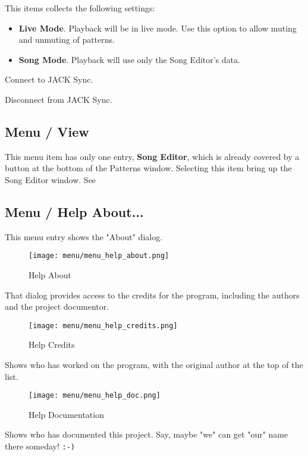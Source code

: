    This items collects the following settings:

   \begin{itemize}
      \item \textbf{Live Mode}.
         Playback will be in live mode.  Use this option to allow muting and
         unmuting of patterns.
      \item \textbf{Song Mode}.
         Playback will use only the Song Editor's data.
   \end{itemize}

   Connect to JACK Sync.

   Disconnect from JACK Sync.

\subsection{Menu / View}
\label{subsec:seq24_menu_view}

   This menu item has only one entry, \textbf{Song Editor}, 
   which is already covered by a button at the bottom of the Patterns
   window.  Selecting this item bring up the Song Editor window.
   See 

\subsection{Menu / Help About...}
\label{subsec:seq24_menu_about}

   This menu entry shows the "About" dialog.

\begin{figure}[H]
   \centering 
   \texttt{[image: menu/menu\_help\_about.png]}
   \caption{Help About}
   \label{fig:seq24_menu_help_about}
\end{figure}

   That dialog provides access to the credits for the program, including the
   authors and the project documentor.

\begin{figure}[H]
   \centering 
   \texttt{[image: menu/menu\_help\_credits.png]}
   \caption{Help Credits}
   \label{fig:seq24_menu_help_credits}
\end{figure}

   Shows who has worked on the program, with the original author at the top
   of the list.

\begin{figure}[H]
   \centering 
   \texttt{[image: menu/menu\_help\_doc.png]}
   \caption{Help Documentation}
   \label{fig:seq24_menu_help_doc}
\end{figure}

   Shows who has documented this project.  Say, maybe "we" can get "our"
   name there someday!  \texttt{:-)}


